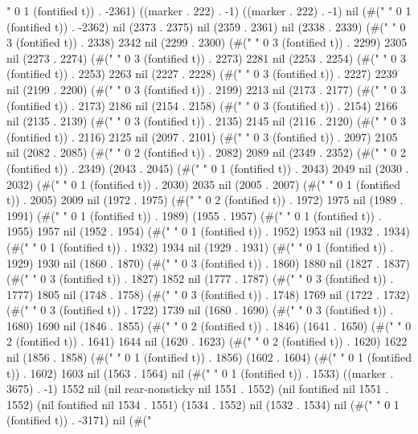 " 0 1 (fontified t)) . -2361) ((marker . 222) . -1) ((marker . 222) . -1) nil (#(" " 0 1 (fontified t)) . -2362) nil (2373 . 2375) nil (2359 . 2361) nil (2338 . 2339) (#("   " 0 3 (fontified t)) . 2338) 2342 nil (2299 . 2300) (#("   " 0 3 (fontified t)) . 2299) 2305 nil (2273 . 2274) (#("   " 0 3 (fontified t)) . 2273) 2281 nil (2253 . 2254) (#("   " 0 3 (fontified t)) . 2253) 2263 nil (2227 . 2228) (#("   " 0 3 (fontified t)) . 2227) 2239 nil (2199 . 2200) (#("   " 0 3 (fontified t)) . 2199) 2213 nil (2173 . 2177) (#("   " 0 3 (fontified t)) . 2173) 2186 nil (2154 . 2158) (#("   " 0 3 (fontified t)) . 2154) 2166 nil (2135 . 2139) (#("   " 0 3 (fontified t)) . 2135) 2145 nil (2116 . 2120) (#("   " 0 3 (fontified t)) . 2116) 2125 nil (2097 . 2101) (#("   " 0 3 (fontified t)) . 2097) 2105 nil (2082 . 2085) (#("  " 0 2 (fontified t)) . 2082) 2089 nil (2349 . 2352) (#("  " 0 2 (fontified t)) . 2349) (2043 . 2045) (#(" " 0 1 (fontified t)) . 2043) 2049 nil (2030 . 2032) (#(" " 0 1 (fontified t)) . 2030) 2035 nil (2005 . 2007) (#(" " 0 1 (fontified t)) . 2005) 2009 nil (1972 . 1975) (#("  " 0 2 (fontified t)) . 1972) 1975 nil (1989 . 1991) (#(" " 0 1 (fontified t)) . 1989) (1955 . 1957) (#(" " 0 1 (fontified t)) . 1955) 1957 nil (1952 . 1954) (#(" " 0 1 (fontified t)) . 1952) 1953 nil (1932 . 1934) (#(" " 0 1 (fontified t)) . 1932) 1934 nil (1929 . 1931) (#(" " 0 1 (fontified t)) . 1929) 1930 nil (1860 . 1870) (#("   " 0 3 (fontified t)) . 1860) 1880 nil (1827 . 1837) (#("   " 0 3 (fontified t)) . 1827) 1852 nil (1777 . 1787) (#("   " 0 3 (fontified t)) . 1777) 1805 nil (1748 . 1758) (#("   " 0 3 (fontified t)) . 1748) 1769 nil (1722 . 1732) (#("   " 0 3 (fontified t)) . 1722) 1739 nil (1680 . 1690) (#("   " 0 3 (fontified t)) . 1680) 1690 nil (1846 . 1855) (#("  " 0 2 (fontified t)) . 1846) (1641 . 1650) (#("  " 0 2 (fontified t)) . 1641) 1644 nil (1620 . 1623) (#("  " 0 2 (fontified t)) . 1620) 1622 nil (1856 . 1858) (#(" " 0 1 (fontified t)) . 1856) (1602 . 1604) (#(" " 0 1 (fontified t)) . 1602) 1603 nil (1563 . 1564) nil (#(" " 0 1 (fontified t)) . 1533) ((marker . 3675) . -1) 1552 nil (nil rear-nonsticky nil 1551 . 1552) (nil fontified nil 1551 . 1552) (nil fontified nil 1534 . 1551) (1534 . 1552) nil (1532 . 1534) nil (#(" " 0 1 (fontified t)) . -3171) nil (#("
